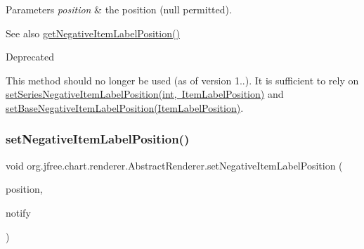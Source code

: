 \begin{DoxyParams}{Parameters}
{\em position} & the position ({\ttfamily null} permitted).\\
\hline
\end{DoxyParams}
\begin{DoxySeeAlso}{See also}
\mbox{\hyperlink{classorg_1_1jfree_1_1chart_1_1renderer_1_1_abstract_renderer_a1342825ba4cb7d47141e73b83fc50903}{get\+Negative\+Item\+Label\+Position()}}
\end{DoxySeeAlso}
\begin{DoxyRefDesc}{Deprecated}
\item[\mbox{\hyperlink{deprecated__deprecated000141}{Deprecated}}]This method should no longer be used (as of version 1..). It is sufficient to rely on \mbox{\hyperlink{classorg_1_1jfree_1_1chart_1_1renderer_1_1_abstract_renderer_a308ce803c5fb75f2804b6f54d24877f5}{set\+Series\+Negative\+Item\+Label\+Position(int, Item\+Label\+Position)}} and \mbox{\hyperlink{classorg_1_1jfree_1_1chart_1_1renderer_1_1_abstract_renderer_a7b884e49e671f85f564084b3be63aa3d}{set\+Base\+Negative\+Item\+Label\+Position(\+Item\+Label\+Position)}}. \end{DoxyRefDesc}
\mbox{\label{classorg_1_1jfree_1_1chart_1_1renderer_1_1_abstract_renderer_aea75a4da8fcbdd4db4e28c5fe5659ec1}} 
\subsubsection{\texorpdfstring{set\+Negative\+Item\+Label\+Position()}{setNegativeItemLabelPosition()}\hspace{0.1cm}{\footnotesize\ttfamily [2/2]}}
{\footnotesize\ttfamily void org.\+jfree.\+chart.\+renderer.\+Abstract\+Renderer.\+set\+Negative\+Item\+Label\+Position (\begin{DoxyParamCaption}\item[{\mbox{\hyperlink{classorg_1_1jfree_1_1chart_1_1labels_1_1_item_label_position}{Item\+Label\+Position}}}]{position,  }\item[{boolean}]{notify }\end{DoxyParamCaption})}

